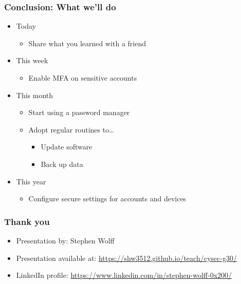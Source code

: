 \documentclass[blue]{beamer}
\begin{document}
\begin{frame}
\frametitle{Conclusion: What we'll do}

\begin{itemize}
  \item Today
  \begin{itemize}
    \item Share what you learned with a friend
  \end{itemize}
  \item This week
  \begin{itemize}
    \item Enable MFA on sensitive accounts
  \end{itemize}
  \item This month
  \begin{itemize}
    \item Start using a password manager
    \item Adopt regular routines to\ldots{}
    \begin{itemize}
      \item Update software
      \item Back up data
    \end{itemize}
  \end{itemize}
  \item This year
  \begin{itemize}
    \item Configure secure settings for accounts and devices
  \end{itemize}
\end{itemize}

\end{frame}



\begin{frame}
\frametitle{Thank you}

\begin{itemize}
  \item Presentation by: Stephen Wolff
  \item Presentation available at: \url{https://shw3512.github.io/teach/cysec-g30/}
  \item LinkedIn profile: \url{https://www.linkedin.com/in/stephen-wolff-0x200/}
\end{itemize}

\end{frame}
\end{document}
